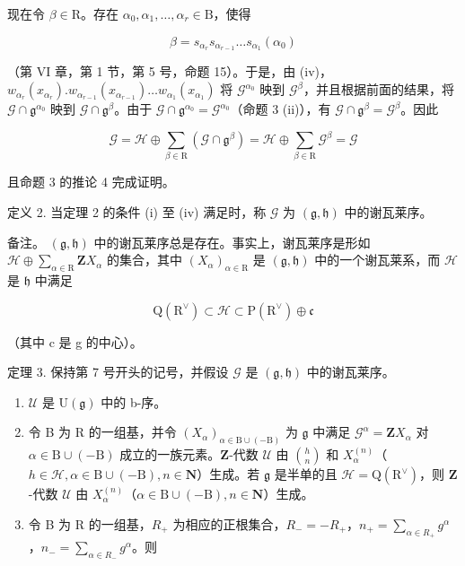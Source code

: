 现在令 \(\beta \in \mathrm{R}\)。存在 \(\alpha_0, \alpha_1, \ldots, \alpha_r \in \mathrm{B}\)，使得

\[
\beta = s _ {\alpha_ {r}} s _ {\alpha_ {r - 1}} \dots s _ {\alpha_ {1}} (\alpha_ {0})
\]

（第 VI 章，第 1 节，第 5 号，命题 15）。于是，由 (iv)，\(w_{\alpha_r}(x_{\alpha_r}).w_{\alpha_{r-1}}(x_{\alpha_{r-1}}) \ldots w_{\alpha_1}(x_{\alpha_1})\) 将 \(\mathcal{G}^{\alpha_0}\) 映到 \(\mathcal{G}^\beta\)，并且根据前面的结果，将 \(\mathcal{G} \cap \mathfrak{g}^{\alpha_0}\) 映到 \(\mathcal{G} \cap \mathfrak{g}^\beta\)。由于 \(\mathcal{G} \cap \mathfrak{g}^{\alpha_0} = \mathcal{G}^{\alpha_0}\)（命题 3 (ii)），有 \(\mathcal{G} \cap \mathfrak{g}^\beta = \mathcal{G}^\beta\)。因此

\[
\mathcal {G} = \mathcal {H} \oplus \sum_ {\beta \in \mathrm{R}} (\mathcal {G} \cap \mathfrak {g} ^ {\beta}) = \mathcal {H} \oplus \sum_ {\beta \in \mathrm{R}} \mathcal {G} ^ {\beta} = \mathcal {G}
\]

且命题 3 的推论 4 完成证明。

定义 2. 当定理 2 的条件 (i) 至 (iv) 满足时，称 \(\mathcal{G}\) 为 \((\mathfrak{g}, \mathfrak{h})\) 中的谢瓦莱序。

备注。 \((\mathfrak{g},\mathfrak{h})\) 中的谢瓦莱序总是存在。事实上，谢瓦莱序是形如 \(\mathcal{H}\oplus\sum_{\alpha\in \mathrm{R}}\mathbf{Z}X_{\alpha}\) 的集合，其中 \((X_{\alpha})_{\alpha\in \mathrm{R}}\) 是 \((\mathfrak{g},\mathfrak{h})\) 中的一个谢瓦莱系，而 \(\mathcal{H}\) 是 \(\mathfrak{h}\) 中满足

\[
\mathrm{Q} (\mathrm{R} ^ {\vee}) \subset \mathcal {H} \subset \mathrm{P} (\mathrm{R} ^ {\vee}) \oplus \mathfrak {c}
\]

（其中 c 是 g 的中心）。

定理 3. 保持第 7 号开头的记号，并假设 \(\mathcal{G}\) 是 \((\mathfrak{g},\mathfrak{h})\) 中的谢瓦莱序。

\begin{enumerate}
\def\labelenumi{(\roman{enumi})}
\item
  \(\mathcal{U}\) 是 \(\mathrm{U}(\mathfrak{g})\) 中的 b-序。
\item
  令 B 为 \(\mathrm{R}\) 的一组基，并令 \((X_{\alpha})_{\alpha\in\mathrm{B}\cup(-\mathrm{B})}\) 为 \(\mathfrak{g}\) 中满足 \(\mathcal{G}^{\alpha}=\mathbf{Z}X_{\alpha}\) 对 \(\alpha\in\mathrm{B}\cup(-\mathrm{B})\) 成立的一族元素。\(\mathbf{Z}\)-代数 \(\mathcal{U}\) 由 \(\binom{h}{n}\) 和 \(X_{\alpha}^{(n)}\)（\(h\in\mathcal{H},\alpha\in\mathrm{B}\cup(-\mathrm{B}),n\in\mathbf{N}\)）生成。若 \(\mathfrak{g}\) 是半单的且 \(\mathcal{H}=\mathrm{Q}(\mathrm{R}^{\vee})\)，则 \(\mathbf{Z}\)-代数 \(\mathcal{U}\) 由 \(X_{\alpha}^{(n)}\)（\(\alpha\in\mathrm{B}\cup(-\mathrm{B}),n\in\mathbf{N}\)）生成。
\item
  令 B 为 R 的一组基，\(R_{+}\) 为相应的正根集合，\(R_{-} = -R_{+}\)，\(n_{+} = \sum_{\alpha \in R_{+}} g^{\alpha}\)，\(n_{-} = \sum_{\alpha \in R_{-}} g^{\alpha}\)。则
\end{enumerate}


